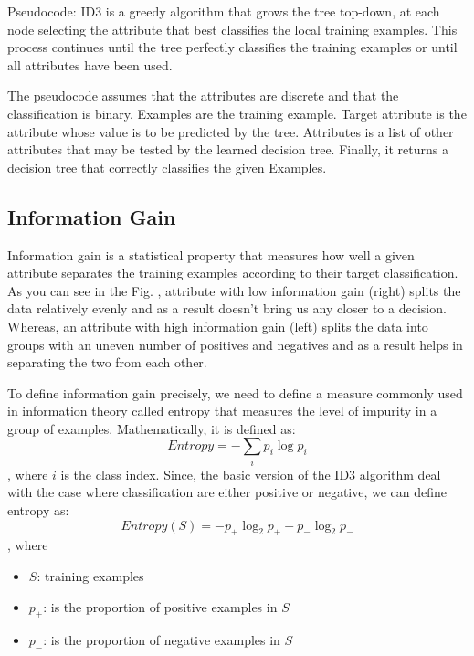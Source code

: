 Pseudocode: ID3 is a greedy algorithm that grows the tree top-down, at each node selecting the attribute that best classifies the local training examples. This process continues until the tree perfectly classifies the training examples or until all attributes have been used.

The pseudocode assumes that the attributes are discrete and that the classification is binary. Examples are the training example. Target attribute is the attribute whose value is to be predicted by the tree. Attributes is a list of other attributes that may be tested by the learned decision tree. Finally, it returns a decision tree that correctly classifies the given Examples.

\subsection{Information Gain}
Information gain is a statistical property that measures how well a given attribute separates the training examples according to their target classification. As you can see in the Fig. , attribute with low information gain (right) splits the data relatively evenly and as a result doesn't bring us any closer to a decision. Whereas, an attribute with high information gain (left) splits the data into groups with an uneven number of positives and negatives and as a result helps in separating the two from each other.



To define information gain precisely, we need to define a measure commonly used in information theory called entropy that measures the level of impurity in a group of examples. Mathematically, it is defined as:
$$Entropy = -\sum_i p_i \log p_i$$
, where $i$ is the class index. Since, the basic version of the ID3 algorithm deal with the case where classification are either positive or negative, we can define entropy as:
$$Entropy(S) = -p_+\log_2 p_+ - p_-\log_2 p_-$$
, where 
\begin{itemize}
    \item $S$: training examples
    \item $p_+$: is the proportion of positive examples in $S$
    \item $p_-$: is the proportion of negative examples in $S$
\end{itemize}

